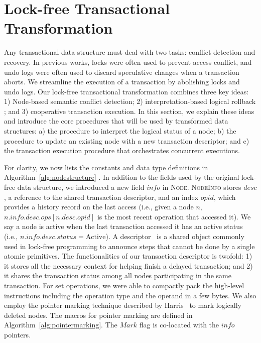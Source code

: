 \documentclass[10pt,conference,compsocconf]{IEEEtran}
\begin{document}
\section{Lock-free Transactional Transformation}
\label{sec:algorithm}
Any transactional data structure must deal with two tasks: conflict detection and recovery.
In previous works, locks were often used to prevent access conflict, and undo logs were often used to discard speculative changes when a transaction aborts.
We streamline the execution of a transaction by abolishing locks and undo logs.
Our lock-free transactional transformation combines three key ideas: 1) Node-based semantic conflict detection; 2) interpretation-based logical rollback ; and 3) cooperative transaction execution.
In this section, we explain these ideas and introduce the core procedures that will be used by transformed data structures: a) the procedure to interpret the logical status of a node; b) the procedure to update an existing node with a new transaction descriptor; and c) the transaction execution procedure that orchestrates concurrent executions.

For clarity, we now lists the constants and data type definitions in Algorithm~\ref{alg:nodestructure} .
In addition to the fields used by the original lock-free data structure, we introduced a new field $info$ in \textsc{Node}.
\textsc{NodeInfo} stores $desc$, a reference to the shared transaction descriptor, and an index $opid$, which provides a history record on the last access (i.e., given a node $n$, $n.info.desc.ops[n.desc.opid]$ is the most recent operation that accessed it).
We say a node is active when the last transaction accessed it has an active status (i.e., $n.info.desc.status=\text{Active}$).
A descriptor~\cite{herlihy2012art} is a shared object commonly used in lock-free programming to announce steps that cannot be done by a single atomic primitives.
The functionalities of our transaction descriptor is twofold: 1) it stores all the necessary context for helping finish a delayed transaction; and 2) it shares the transaction status among all nodes participating in the same transaction.
For set operations, we were able to compactly pack the high-level instructions including the operation type and the operand in a few bytes.
We also employ the pointer marking technique described by Harris~\cite{harris2001pragmatic} to mark logically deleted nodes. 
The macros for pointer marking are defined in Algorithm~\ref{alg:pointermarking}.
The $Mark$ flag is co-located with the $info$ pointers.
\end{document}
